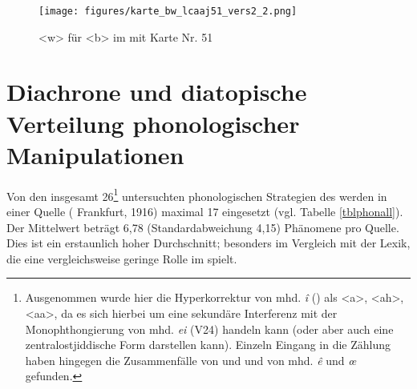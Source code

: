  
		  \begin{figure}[h!]
		\centering
\texttt{[image: figures/karte\_bw\_lcaaj51\_vers2\_2.png]}
		\caption{\label{kartebwlcaaj} <w> für <b> im  mit  Karte Nr. 51}
\end{figure}
\FloatBarrier
		

  \section{Diachrone und diatopische Verteilung phonologischer Manipulationen}\label{fazitphon}
 
 
 Von den insgesamt 26\footnote{Ausgenommen wurde hier die Hyperkorrektur von mhd. \textit{î} () als <a>, <ah>, <aa>, da es sich hierbei um eine sekundäre Interferenz mit der Monophthongierung von mhd. \textit{ei} (V24) handeln kann (oder aber auch eine zentralostjiddische Form darstellen kann). Einzeln Eingang in die Zählung haben hingegen die Zusammenfälle von  und  und von mhd. \textit{ê} und \textit{œ} gefunden.} untersuchten phonologischen Strategien des  werden in einer Quelle ( Frankfurt, 1916) maximal 17 eingesetzt (vgl. Tabelle \ref{tblphonall}). Der Mittelwert beträgt 6,78 (Standardabweichung 4,15) Phänomene pro Quelle. Dies ist ein erstaunlich hoher Durchschnitt; besonders im Vergleich mit der Lexik, die eine vergleichsweise geringe Rolle im  spielt. \\
  
